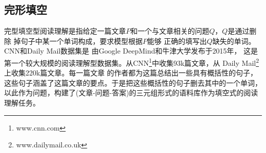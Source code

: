 
















\subsection{完形填空}
完型填空型阅读理解是指给定一篇文章$P$和一个与文章相关的问题$Q$，$Q$是通过删除
掉句子中某一个单词构成，要求模型根据$P$能够
正确的填写出$Q$缺失的单词。CNN和Daily Mail数据集是
由Google DeepMind和牛津大学发布于2015年，
这是第一个较大规模的阅读理解型数据集。从CNN\footnote{www.cnn.com\label{cnn}}中收集93k篇文章，从
Daily Mail\footnote{www.dailymail.co.uk\label{daily mail}}上收集220k篇文章。每一篇文章
的作者都为这篇总结出一些具有概括性的句子，这些句子涵盖了这篇文章的要点。于是把这些概括性的句子删去其中的一个单词，
以此作为问题，构建了(文章-问题-答案)的三元组形式的语料库作为填空式的阅读理解任务。


